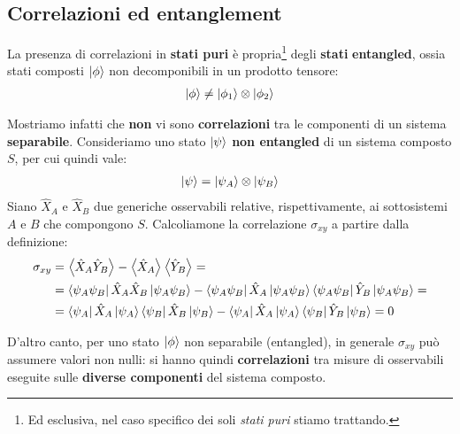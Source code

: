 \documentclass[../../InformazioneQuantistica.tex]{subfiles}
\begin{document}
\subsection{Correlazioni ed entanglement}
La presenza di correlazioni in \textbf{stati puri} è propria\footnote{Ed esclusiva, nel caso specifico dei soli \textit{stati puri} stiamo trattando.} degli \textbf{stati} \textbf{entangled}, ossia stati composti $\Ket{\phi}$ non decomponibili in un prodotto tensore:
\begin{align*}
\Ket{\phi} \neq \Ket{\phi_1}\otimes \Ket{\phi_2}
\end{align*}

Mostriamo infatti che \textbf{non} vi sono \textbf{correlazioni} tra le componenti di un sistema \textbf{separabile}. Consideriamo uno stato $\Ket{\psi}$ \textbf{non entangled} di un sistema composto $S$, per cui quindi vale:
\begin{align*}
\Ket{\psi}=\Ket{\psi_A}\otimes \Ket{\psi_B}
\end{align*}
Siano $\hat{X}_A$ e $\hat{X}_B$ due generiche osservabili relative, rispettivamente, ai sottosistemi $A$ e $B$ che compongono $S$. Calcoliamone la correlazione $\sigma_{xy}$ a partire dalla definizione:
\begin{align*}
\sigma_{xy} &= \left\langle{\hat{X}_A \hat{Y}_B}\right\rangle - \left\langle{\hat{X}_A}\right\rangle \left\langle{\hat{Y}_B}\right\rangle = \\
&=\Bra{\psi_A \psi_B} \hat{X}_A \hat{X}_B \Ket{\psi_A \psi_B}- \Bra{\psi_A \psi_B}\hat{X}_A \Ket{\psi_A\psi_B}\Bra{\psi_A\psi_B}\hat{Y}_B \Ket{\psi_A\psi_B} =\\
&=\Bra{\psi_A}\hat{X}_A \Ket{\psi_A}\Bra{\psi_B}\hat{X}_B \Ket{\psi_B} - \Bra{\psi_A}\hat{X}_A\Ket{\psi_A}\Bra{\psi_B}\hat{Y}_B\Ket{\psi_B} = 0
\end{align*}

D'altro canto, per uno stato $\Ket{\phi}$ non separabile (entangled), in generale $\sigma_{xy}$ può assumere valori non nulli: si hanno quindi \textbf{correlazioni} tra misure di osservabili eseguite sulle \textbf{diverse componenti} del sistema composto.
\end{document}
